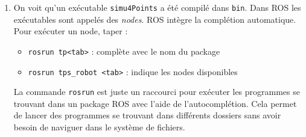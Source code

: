 \documentclass[12pt,a4paper]{article}
\begin{document}
\begin{enumerate}

\item On voit qu'un exécutable \texttt{simu4Points} a été compilé dans \texttt{bin}. Dans ROS les exécutables sont appelés des \emph{nodes}.
ROS intègre la complétion automatique. Pour exécuter un node, taper :
\begin{itemize}
\item \texttt{rosrun tp<tab>} : complète avec le nom du package
\item \texttt{rosrun tps\_robot <tab>} : indique les nodes disponibles
\end{itemize}
La commande \texttt{rosrun} est juste un raccourci pour exécuter les programmes se trouvant dans un package ROS avec l'aide de l'autocomplétion. Cela permet de lancer des programmes se trouvant dans différents dossiers sans avoir besoin de naviguer dans le système de fichiers.


\end{enumerate}
\end{document}
